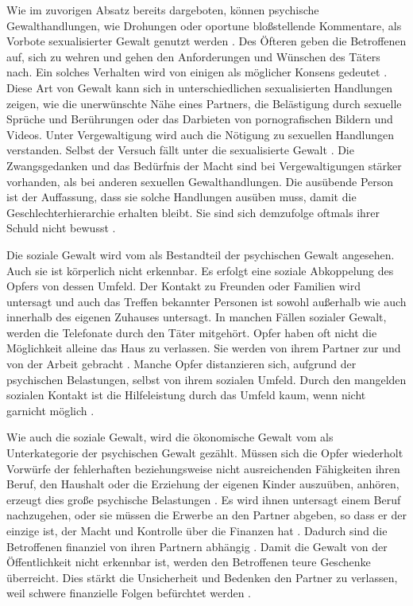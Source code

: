 Wie im zuvorigen Absatz bereits dargeboten, können psychische Gewalthandlungen, wie Drohungen oder oportune bloßstellende Kommentare, als Vorbote sexualisierter Gewalt genutzt werden \parencite{Übergang_psy_zu_sex_Gewalt}. Des Öfteren geben die Betroffenen auf, sich zu wehren und gehen den Anforderungen und Wünschen des Täters nach. Ein solches Verhalten wird von einigen als möglicher Konsens gedeutet \parencite{Def_haus_Gewalt_2}. Diese Art von Gewalt kann sich in unterschiedlichen sexualisierten Handlungen zeigen, wie die unerwünschte Nähe eines Partners, die Belästigung durch sexuelle Sprüche und Berührungen oder das Darbieten von pornografischen Bildern und Videos. Unter Vergewaltigung wird auch die Nötigung zu sexuellen Handlungen verstanden. Selbst der Versuch fällt unter die sexualisierte Gewalt \parencite{Def_haus_Gewalt_2, Gewaltart, Def_Form_Folge_Gewalt}. Die Zwangsgedanken und das Bedürfnis der Macht sind bei Vergewaltigungen stärker vorhanden, als bei anderen sexuellen Gewalthandlungen. Die ausübende Person ist der Auffassung, dass sie solche Handlungen ausüben muss, damit die Geschlechterhierarchie erhalten bleibt. Sie sind sich demzufolge oftmals ihrer Schuld nicht bewusst \parencite{Def_haus_Gewalt_2}.

Die soziale Gewalt wird vom \textcite{Def_Form_Folge_Gewalt} als Bestandteil der psychischen Gewalt angesehen. Auch sie ist körperlich nicht erkennbar. Es erfolgt eine soziale Abkoppelung des Opfers von dessen Umfeld. Der Kontakt zu Freunden oder Familien wird untersagt und auch das Treffen bekannter Personen ist sowohl außerhalb wie auch innerhalb des eigenen Zuhauses untersagt. In manchen Fällen sozialer Gewalt, werden die Telefonate durch den Täter mitgehört. Opfer haben oft nicht die Möglichkeit alleine das Haus zu verlassen. Sie werden von ihrem Partner zur und von der Arbeit gebracht \parencite{Def_haus_Gewalt_2, Def_Form_Folge_Gewalt}. Manche Opfer distanzieren sich, aufgrund der psychischen Belastungen, selbst von ihrem sozialen Umfeld. Durch den mangelden sozialen Kontakt ist die Hilfeleistung durch das Umfeld kaum, wenn nicht garnicht möglich \parencite{Def_haus_Gewalt_2}.

Wie auch die soziale Gewalt, wird die ökonomische Gewalt vom \textcite{Def_Form_Folge_Gewalt} als Unterkategorie der psychischen Gewalt gezählt. Müssen sich die Opfer wiederholt Vorwürfe der fehlerhaften beziehungsweise nicht ausreichenden Fähigkeiten ihren Beruf, den Haushalt oder die Erziehung der eigenen Kinder auszuüben, anhören, erzeugt dies große psychische Belastungen \parencite{Def_haus_Gewalt_2}. Es wird ihnen untersagt einem Beruf nachzugehen, oder sie müssen die Erwerbe an den Partner abgeben, so dass er der einzige ist, der Macht und Kontrolle über die Finanzen hat \parencite{Def_haus_Gewalt_2, Def_Form_Folge_Gewalt}. Dadurch sind die Betroffenen finanziel von ihren Partnern abhängig \parencite{physische_Gewalt_wie_aggro}. Damit die Gewalt von der Öffentlichkeit nicht erkennbar ist, werden den Betroffenen teure Geschenke überreicht. Dies stärkt die Unsicherheit und Bedenken den Partner zu verlassen, weil schwere finanzielle Folgen befürchtet werden \parencite{Übergang_psy_zu_sex_Gewalt}.

